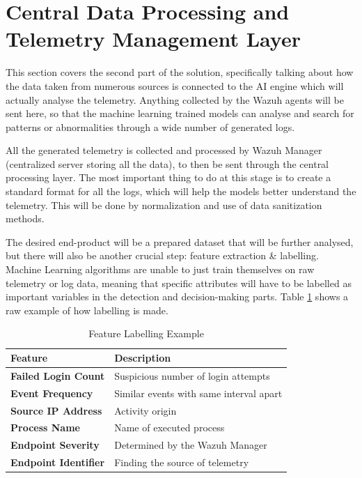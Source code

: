 \documentclass[12pt,a4paper]{report}
\begin{document}
\section{Central Data Processing and Telemetry Management Layer}

This section covers the second part of the solution, specifically talking about how the data taken
from numerous sources is connected to the AI engine which will actually analyse the telemetry.
Anything collected by the Wazuh agents will be sent here, so that the machine learning trained
models can analyse and search for patterns or abnormalities through a wide number of generated
logs.

All the generated telemetry is collected and processed by Wazuh Manager (centralized server
storing all the data), to then be sent through the central processing layer. The most important
thing to do at this stage is to create a standard format for all the logs, which will help the
models better understand the telemetry. This will be done by normalization and use of data
sanitization methods.

The desired end-product will be a prepared dataset that will be further analysed, but there will
also be another crucial step: feature extraction \& labelling. Machine Learning algorithms are
unable to just train themselves on raw telemetry or log data, meaning that specific attributes
will have to be labelled as important variables in the detection and decision-making parts. Table
\ref{tab:feature_labels} shows a raw example of how labelling is made.

\begin{table}[htbp]
  \centering
  \caption{Feature Labelling Example}
  \label{tab:feature_labels}
  \begin{tabular}{>{\bfseries}p{4.5cm} p{9cm}}
    \toprule
    Feature & Description \\
    \midrule
    Failed Login Count    & Suspicious number of login attempts \\
    Event Frequency       & Similar events with same interval apart \\
    Source IP Address     & Activity origin \\
    Process Name          & Name of executed process \\
    Endpoint Severity     & Determined by the Wazuh Manager \\
    Endpoint Identifier   & Finding the source of telemetry \\
    \bottomrule
  \end{tabular}
\end{table}
\end{document}
